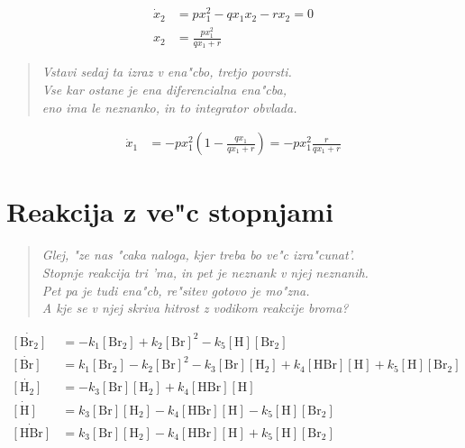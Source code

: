 \documentclass[a4paper,10pt]{article}
\begin{document}
\begin{align}
 \dot x_2 &= p x_1^2 - q x_1 x_2 - r x_2 = 0\\
 x_2 &= \frac{px_1^2}{qx_1 + r}
\end{align}

\begin{verse}
\textit{Vstavi sedaj ta izraz v ena"cbo, tretjo povrsti. \\%
Vse kar ostane je ena diferencialna ena"cba, \\
eno ima le neznanko, in to integrator obvlada. }
\end{verse}

\begin{align}
\dot x_1 &= -p x_1^2 \left( 1 - \frac{qx_1}{qx_1 + r} \right) = -px_1^2 \frac{r}{qx_1 + r}
\end{align}

\section{Reakcija z ve"c stopnjami}

\begin{verse}
\textit{Glej, "ze nas "caka naloga, kjer treba bo ve"c izra"cunat'.  \\
Stopnje reakcija tri 'ma, in pet je neznank v njej neznanih. \\
Pet pa je tudi ena"cb, re"sitev gotovo je mo"zna. \\
A kje se v njej skriva hitrost z vodikom reakcije broma?  }
\end{verse}

\begin{align}
 \dot{[\mathrm{Br_2}]} &= - k_1 [\mathrm{Br_2}] + k_2 [\mathrm{Br}]^2 - k_5 [\mathrm{H}] [\mathrm{Br_2}] \\
 \dot{[\mathrm{Br}]} &= k_1 [\mathrm{Br_2}] - k_2 [\mathrm{Br}]^2 - k_3 [\mathrm{Br}] [\mathrm{H_2}] + k_4 [\mathrm{HBr}] [\mathrm{H}] + k_5 [\mathrm{H}] [\mathrm{Br_2}]\\
 \dot{[\mathrm{H_2}]} &= - k_3 [\mathrm{Br}] [\mathrm{H_2}] + k_4 [\mathrm{HBr}] [\mathrm{H}] \\
 \dot{[\mathrm{H}]} &= k_3 [\mathrm{Br}] [\mathrm{H_2}] - k_4 [\mathrm{HBr}] [\mathrm{H}] - k_5 [\mathrm{H}] [\mathrm{Br_2}]\\
\dot{[\mathrm{HBr}]} &= k_3 [\mathrm{Br}] [\mathrm{H_2}] - k_4 [\mathrm{HBr}] [\mathrm{H}] + k_5 [\mathrm{H}] [\mathrm{Br_2}]
\end{align}
\end{document}
